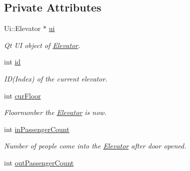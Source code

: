 \subsection*{Private Attributes}
\begin{DoxyCompactItemize}
\item 
\hypertarget{class_elevator_a008833dba4a008951035b3ab1ca9231a}{
Ui::Elevator $\ast$ \hyperlink{class_elevator_a008833dba4a008951035b3ab1ca9231a}{ui}}
\label{class_elevator_a008833dba4a008951035b3ab1ca9231a}

\begin{DoxyCompactList}\small\item\em Qt UI object of \hyperlink{class_elevator}{Elevator}. \end{DoxyCompactList}\item 
\hypertarget{class_elevator_aa31e06e205c1c29028deafa7ecff4ae8}{
int \hyperlink{class_elevator_aa31e06e205c1c29028deafa7ecff4ae8}{id}}
\label{class_elevator_aa31e06e205c1c29028deafa7ecff4ae8}

\begin{DoxyCompactList}\small\item\em ID(Index) of the current elevator. \end{DoxyCompactList}\item 
\hypertarget{class_elevator_a07597b24e92d6a74db2c97035edd225e}{
int \hyperlink{class_elevator_a07597b24e92d6a74db2c97035edd225e}{curFloor}}
\label{class_elevator_a07597b24e92d6a74db2c97035edd225e}

\begin{DoxyCompactList}\small\item\em Floornumber the \hyperlink{class_elevator}{Elevator} is now. \end{DoxyCompactList}\item 
\hypertarget{class_elevator_a29320516a530002a9156fcaf6b006a91}{
int \hyperlink{class_elevator_a29320516a530002a9156fcaf6b006a91}{inPassengerCount}}
\label{class_elevator_a29320516a530002a9156fcaf6b006a91}

\begin{DoxyCompactList}\small\item\em Number of people come into the \hyperlink{class_elevator}{Elevator} after door opened. \end{DoxyCompactList}\item 
\hypertarget{class_elevator_a2ddde08d62ca990aa07160e45f3eef0e}{
int \hyperlink{class_elevator_a2ddde08d62ca990aa07160e45f3eef0e}{outPassengerCount}}
\label{class_elevator_a2ddde08d62ca990aa07160e45f3eef0e}


\end{DoxyCompactItemize}

